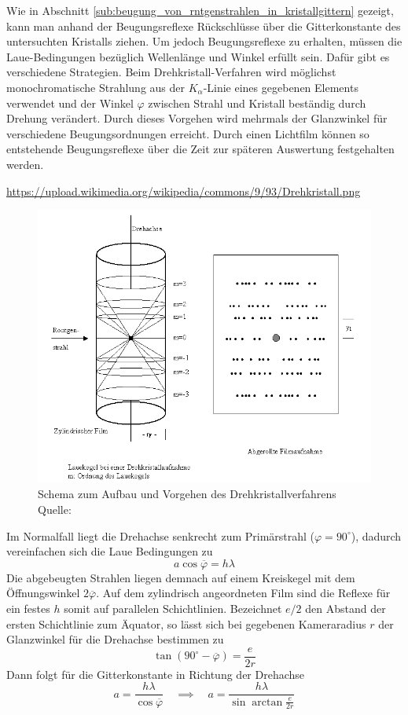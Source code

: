 		Wie in Abschnitt \ref{sub:beugung_von_rntgenstrahlen_in_kristallgittern} gezeigt, kann man anhand der Beugungsreflexe Rückschlüsse über die Gitterkonstante des untersuchten Kristalls ziehen.
		Um jedoch Beugungsreflexe zu erhalten, müssen die Laue-Bedingungen bezüglich Wellenlänge und Winkel erfüllt sein.
		Dafür gibt es verschiedene Strategien.
		Beim Drehkristall-Verfahren wird möglichst monochromatische Strahlung aus der $K_\alpha$-Linie eines gegebenen Elements verwendet und der Winkel $\varphi$ zwischen Strahl und Kristall beständig durch Drehung verändert.
		Durch dieses Vorgehen wird mehrmals der Glanzwinkel für verschiedene Beugungsordnungen erreicht.
		Durch einen Lichtfilm können so entstehende Beugungsreflexe über die Zeit zur späteren Auswertung festgehalten werden.

		\url{https://upload.wikimedia.org/wikipedia/commons/9/93/Drehkristall.png}
		\begin{figure}[htb]
			\centering
			\includegraphics[scale=0.5]{images/Drehkristall.png}
			\caption{Schema zum Aufbau und Vorgehen des Drehkristallverfahrens \\ Quelle: }
			\label{fig:scheme-drehkristall}
		\end{figure}

		Im Normalfall liegt die Drehachse senkrecht zum Primärstrahl ($\varphi = 90^\circ$), dadurch vereinfachen sich die Laue Bedingungen zu
		\[ a \cos \overline{\varphi} = h \lambda \]
		Die abgebeugten Strahlen liegen demnach auf einem Kreiskegel mit dem Öffnungswinkel $2 \overline{\varphi} $.
		Auf dem zylindrisch angeordneten Film sind die Reflexe für ein festes $h$ somit auf parallelen Schichtlinien.
		Bezeichnet $e / 2$ den Abstand der ersten Schichtlinie zum Äquator, so lässt sich bei gegebenen Kameraradius $r$ der Glanzwinkel für die Drehachse bestimmen zu
		\[ \tan (90^\circ - \overline{\varphi}) = \frac{e}{2r} \]
		Dann folgt für die Gitterkonstante in Richtung der Drehachse
		\[ a = \frac{h \lambda}{\cos \overline{\varphi} } \quad \implies \quad a = \frac{h\lambda}{\sin\arctan \frac{e}{2r}} \]


